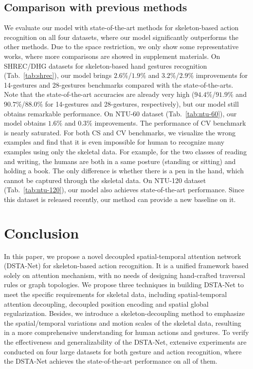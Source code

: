 \documentclass[runningheads]{llncs}
\begin{document}
\subsection{Comparison with previous methods}
We evaluate our model with state-of-the-art methods for skeleton-based action recognition on all four datasets, where our model significantly outperforms the other methods. 
Due to the space restriction, we only show some representative works, where more comparisons are showed in supplement materials. 
On SHREC/DHG datasets for skeleton-based hand gestures recognition (Tab.~\ref{tab:shrec}), our model brings $2.6\%$/$1.9\%$ and $3.2\%$/$2.9\%$ improvements for 14-gestures and 28-gestures benchmarks compared with the state-of-the-arts.
Note that the state-of-the-art accuracies are already very high ($94.4\%$/$91.9\%$ and $90.7\%$/$88.0\%$ for 14-gestures and 28-gestures, respectively), but our model still obtains remarkable performance. 
On NTU-60 dataset (Tab.~\ref{tab:ntu-60}), our model obtains $1.6\%$ and $0.3\%$ improvements. 
The performance of CV benchmark is nearly saturated. For both CS and CV benchmarks, we visualize the wrong examples and find that it is even impossible for human to recognize many examples using only the skeletal data. For example, for the two classes of reading and writing, the humans are both in a same posture (standing or sitting) and holding a book. The only difference is whether there is a pen in the hand, which cannot be captured through the skeletal data. 
On NTU-120 dataset (Tab.~\ref{tab:ntu-120}), our model also achieves state-of-the-art performance. Since this dataset is released recently, our method can provide a new baseline on it. 



\section{Conclusion}
In this paper, we propose a novel decoupled spatial-temporal attention network (DSTA-Net) for skeleton-based action recognition. 
It is a unified framework based solely on attention mechanism, with no needs of designing hand-crafted traversal rules or graph topologies. 
We propose three techniques in building DSTA-Net to meet the specific requirements for skeletal data, including spatial-temporal attention decoupling, decoupled position encoding and spatial global regularization. 
Besides, we introduce a skeleton-decoupling method to emphasize the spatial/temporal variations and motion scales of the skeletal data, resulting in a more comprehensive understanding for human actions and gestures. 
To verify the effectiveness and generalizability of the DSTA-Net, extensive experiments are conducted on four large datasets for both gesture and action recognition, where the DSTA-Net achieves the state-of-the-art performance on all of them. 




\end{document}
